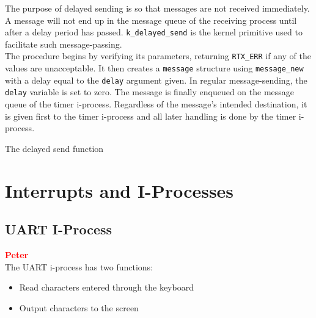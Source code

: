\documentclass[12pt]{report}
\begin{document}
The purpose of delayed sending is so that messages are not received immediately. A message will not end up in the message queue of the receiving process until after a delay period has passed. {\tt k\_delayed\_send} is the kernel primitive used to facilitate such message-passing.\\

The procedure begins by verifying its parameters, returning {\tt RTX_ERR} if any of the values are unacceptable. It then creates a {\tt message} structure using {\tt message\_new} with a delay equal to the {\tt delay} argument given. In regular message-sending, the {\tt delay} variable is set to zero. The message is finally enqueued on the message queue of the timer i-process. Regardless of the message's intended destination, it is given first to the timer i-process and all later handling is done by the timer i-process.\\

\begin{algorithm}
  \caption{The delayed send function}
  \begin{algorithmic}[1]
		\EndIf
		\EndIf
    \EndProcedure
  \end{algorithmic}
\end{algorithm}


\section{Interrupts and I-Processes}

\subsection{UART I-Process}

\textcolor{red}{\textbf{Peter}} \\

The UART i-process has two functions:

\begin{itemize}
\item Read characters entered through the keyboard
\item Output characters to the screen
\end{itemize}
\end{document}
